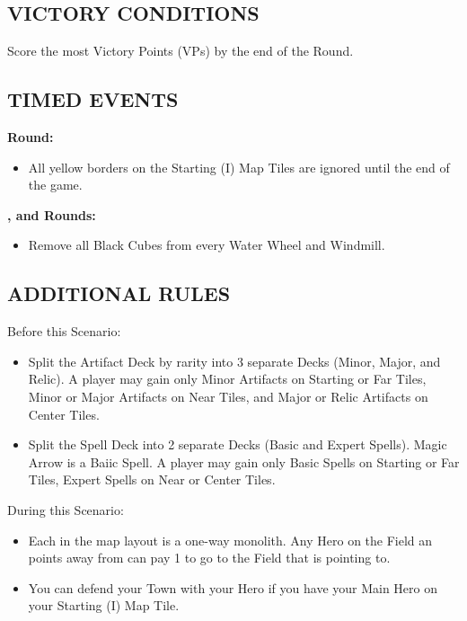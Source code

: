 \begin{multicols}{2}
\subsection*{\MakeUppercase{Victory Conditions}}
Score the most Victory Points (VPs) by the end of the  Round.

\subsection*{\MakeUppercase{Timed Events}}

\textbf{ Round:}
\begin{itemize}
  \item All yellow borders on the Starting (I) Map Tiles are ignored until the end of the game.
\end{itemize}
\textbf{,  and  Rounds:}
\begin{itemize}
  \item Remove all Black Cubes from every Water Wheel and Windmill.
\end{itemize}

\subsection*{\MakeUppercase{Additional Rules}}
Before this Scenario:

\begin{itemize}
  \item Split the Artifact Deck by rarity into 3 separate Decks (Minor, Major, and Relic).
    A player may gain only Minor Artifacts on Starting or Far Tiles, Minor or Major Artifacts on Near Tiles, and Major or Relic Artifacts on Center Tiles.
  \item Split the Spell Deck into 2 separate Decks (Basic and Expert Spells). Magic Arrow is a Baiic Spell.
    A player may gain only Basic Spells on Starting or Far Tiles, Expert Spells on Near or Center Tiles.
\end{itemize}

During this Scenario:

\begin{itemize}
  \item Each  in the map layout is a one-way monolith.
    Any Hero on the Field an  points away from can pay 1  to go to the Field that  is pointing to.
  \item You can defend your Town with your Hero if you have your Main Hero on your Starting (I) Map Tile.
\end{itemize}


\end{multicols}
